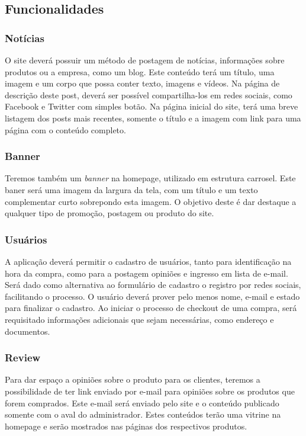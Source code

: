 \subsection{Funcionalidades}

\subsubsection{Notícias}
O site deverá possuir um método de postagem de notícias, informações sobre produtos ou a empresa, como um blog.
Este conteúdo terá um título, uma imagem e um corpo que possa conter texto, imagens e vídeos. Na página de descrição deste post, deverá ser possível compartilha-los em redes sociais, como Facebook e Twitter com simples botão. Na página inicial do site, terá uma breve listagem dos posts mais recentes, somente o título e a imagem com link para uma página com o conteúdo completo.

\subsubsection{Banner}
Teremos também um \textit{banner} na homepage, utilizado em estrutura carrosel. Este baner será uma imagem da largura da tela, com um título e um texto complementar curto sobrepondo esta imagem. O objetivo deste é dar destaque a qualquer tipo de promoção, postagem ou produto do site.

\subsubsection{Usuários}
A aplicação deverá permitir o cadastro de usuários, tanto para identificação na hora da compra, como para a postagem opiniões e ingresso em lista de e-mail. Será dado como alternativa ao formulário de cadastro o registro por redes sociais, facilitando o processo. O usuário deverá prover pelo menos nome, e-mail e estado para finalizar o cadastro. Ao iniciar o processo de checkout de uma compra, será requisitado informações adicionais que sejam necessárias, como endereço e documentos.

\subsubsection{Review}
Para dar espaço a opiniões sobre o produto para os clientes, teremos a possibilidade de ter link enviado por e-mail para opiniões sobre os produtos que forem comprados. Este e-mail será enviado pelo site e o conteúdo publicado somente com o aval do administrador. Estes conteúdos terão uma vitrine na homepage e serão mostrados nas páginas dos respectivos produtos.

